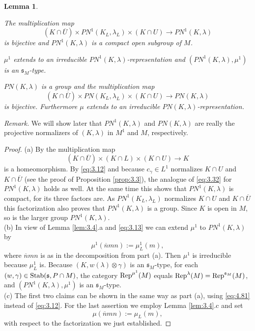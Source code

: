 \documentclass[11pt]{amsart}
\newtheorem{lem}[thm]{Lemma}
\theoremstyle{definition}
\begin{document}
\begin{lem}\label{lem:3.5}
{\begin{enumerate} {{
\item The multiplication map 
\[
(K \cap \overline{U}) \times PN^1 (K_L,\lambda_L) \times (K \cap U) \to PN^1 (K,\lambda)
\]
is bijective and $PN^1 (K,\lambda)$ is a compact open subgroup of $M$.
\item $\mu^1$ extends to an irreducible $PN^1 (K,\lambda)$-representation
and $(PN^1 (K,\lambda),\mu^1)$ is an ${{\mathfrak s}}_M$-type.
\item $PN (K,\lambda)$ is a group and the multiplication map
\[
(K \cap \overline{U}) \times PN (K_L,\lambda_L) \times (K \cap U) \to PN (K,\lambda)
\]
is bijective. Furthermore $\mu $ extends to an irreducible $PN (K,\lambda)$-representation.
}} \end{enumerate}}
\end{lem}
\emph{Remark.} We will show later that $PN^1 (K,\lambda)$ and $PN (K,\lambda)$ 
are really the projective normalizers of $(K,\lambda)$ in $M^1$ and $M$, respectively.
\begin{proof}
(a) By \cite[Proposition 5.3]{Sec3} the multiplication map
\begin{equation}\label{eq:3.32}
(K \cap \overline{U}) \times (K \cap L) \times (K \cap U) \to K 
\end{equation}
is a homeomorphism. By \eqref{eq:3.12} and because $c_\gamma \in L^1$ normalizes 
$K \cap U$ and $K \cap \overline{U}$ (see the proof of Proposition \ref{prop:3.3}), 
the analogue of \eqref{eq:3.32} for $PN^1 (K,\lambda)$ holds as well. At the same time 
this shows that $PN^1 (K,\lambda)$ is compact, for its three factors are. 
As $PN^1 (K_L,\lambda_L)$ normalizes $K \cap U$ and $K \cap \overline{U}$ this 
factorization also proves that $PN^1 (K,\lambda)$ is a group. Since $K$ is
open in $M$, so is the larger group $PN^1 (K,\lambda)$.\\
(b) In view of Lemma \ref{lem:3.4}.a and \eqref{eq:3.13} we can extend $\mu^1$ to
$PN^1 (K,\lambda)$ by
\[
\mu^1 (\overline{n} m n) := \mu_L^1 (m) ,
\]
where $\overline{n} m n$ is as in the decomposition from part (a). Then $\mu^1$ 
is irreducible because $\mu_L^1$ is. Because $(K,w(\lambda) \otimes \gamma)$ is an 
${{\mathfrak s}}_M$-type, for each $(w,\gamma) \in {{\rm Stab}} ({{\mathfrak s}}, P \cap M)$, the category 
${{\rm Rep}}^{\mu^1}(M)$ equals ${{\rm Rep}}^\lambda (M) = {{\rm Rep}}^{{{\mathfrak s}}_M}(M)$, and 
$(PN^1 (K,\lambda), \mu^1)$ is an ${{\mathfrak s}}_M$-type.\\
(c) The first two claims can be shown in the same way as part (a), using \eqref{eq:4.81}
instead of \eqref{eq:3.12}. For the last assertion we employ Lemma \ref{lem:3.4}.c
and set 
\[
\mu  (\overline{n} m n) := \mu_L  (m),
\]
with respect to the factorization we just established.
\end{proof}
\end{document}
